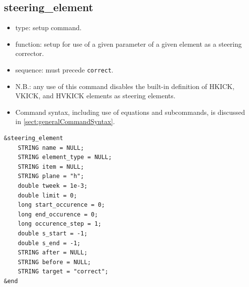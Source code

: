 \documentclass[11pt]{article}
\begin{document}
\subsection{steering\_element \label{subsec:steeringelement}}

\begin{itemize}
\item type: setup command.
\item function: setup for use of a given parameter of a given element as a steering corrector.
\item sequence: must precede \verb|correct|.
\item N.B.: any use of this command disables the built-in definition of HKICK, VKICK, and HVKICK elements
  as steering elements.
\item Command syntax, including use of equations and subcommands, is discussed in \ref{sect:generalCommandSyntax}.
\end{itemize}

\begin{verbatim}
&steering_element
    STRING name = NULL;
    STRING element_type = NULL;
    STRING item = NULL;
    STRING plane = "h";
    double tweek = 1e-3;
    double limit = 0;
    long start_occurence = 0;
    long end_occurence = 0;
    long occurence_step = 1;
    double s_start = -1;
    double s_end = -1;
    STRING after = NULL;
    STRING before = NULL;
    STRING target = "correct";
&end
\end{verbatim}
\end{document}
